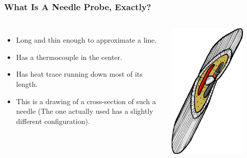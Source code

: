 \documentclass{beamer}
\begin{document}
\begin{frame}
\frametitle{What Is A Needle Probe, Exactly?}
\begin{columns}[c]
    \begin{itemize}
    \item Long and thin enough to approximate a line.
    \item Has a thermocouple in the center.
    \item Has heat trace running down most of its length.
    \item This is a drawing of a cross-section of such a needle (The one
          actually used has a slightly different configuration).
    \end{itemize}
     \includegraphics[width=0.8\textwidth]{fig/needle_xsect.png}
\end{columns}
\end{frame}
\end{document}
